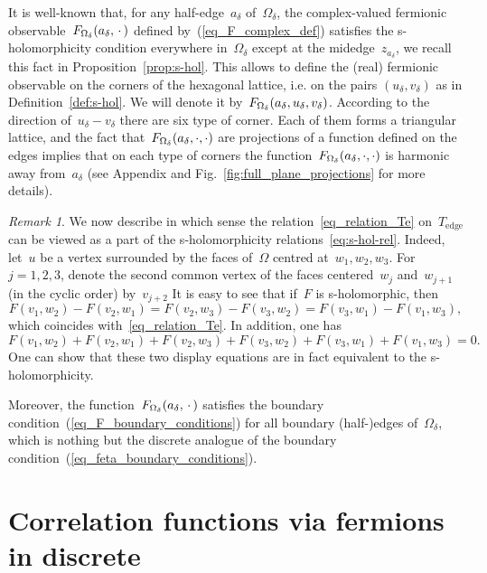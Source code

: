 \documentclass[reqno,11pt,a4paper]{amsart}
\theoremstyle{remark}
\newtheorem{remark}[proposition]{Remark}
\newcommand{\Te}{T_{\mathrm{edge}}}       \newcommand{\Ce}{c_{\mathrm{edge}}}
\begin{document}
It is well-known that, for any half-edge~$a_\delta$ of~$\Omega_\delta$, the complex-valued fermionic observable~$F_{\Omega_\delta}(a_\delta,\,\cdot\,)$ defined by~(\ref{eq_F_complex_def}) satisfies the s-holomorphicity condition everywhere in~$\Omega_\delta$ except at the midedge~$z_{a_\delta}$, we recall this fact in Proposition~\ref{prop:s-hol}. This allows to define the (real) fermionic observable on the corners of the hexagonal lattice, i.e. on the pairs $(u_\delta,v_\delta)$ as in Definition~\ref{def:s-hol}. We will denote it by~$F_{\Omega_\delta} (a_\delta,u_\delta,v_\delta)$.
According to the direction of~$u_\delta - v_\delta$ there are six type of corner. Each of them forms a triangular lattice, and the fact that~$F_{\Omega_\delta} (a_\delta,\cdot,\cdot)$ are projections of a function defined on the edges implies that on each type of corners the function~$F_{\Omega_\delta} (a_\delta,\cdot,\cdot)$ is harmonic away from~$a_\delta$ (see Appendix and Fig.~\ref{fig:full_plane_projections} for more details).

\begin{remark}
\label{rem:propag-eq-and-mercedes}
	We now describe in which sense the relation~\eqref{eq_relation_Te} on~$\Te$ can be viewed as a part of the s-holomorphicity relations~\eqref{eq:s-hol-rel}.
	Indeed, let~$u$ be a vertex surrounded by the faces of~$\Omega$ centred at~$w_1,w_2,w_3$.
	For~$j=1,2,3$, denote the second common vertex of the faces centered~$w_j$ and~$w_{j+1}$ (in the cyclic order) by~$v_{j+2}$
	It is easy to see that if~$F$ is s-holomorphic, then
	\[
		F(v_1,w_2) - F(v_2,w_1) = F(v_2,w_3) - F(v_3,w_2) = F(v_3,w_1) - F(v_1,w_3),
	\]
	which coincides with~\eqref{eq_relation_Te}.
	In addition, one has
	\[
		F(v_1,w_2) + F(v_2,w_1) + F(v_2,w_3) + F(v_3,w_2) + F(v_3,w_1) + F(v_1,w_3) = 0.
	\]
	One can show that these two display equations are in fact equivalent to the s-holomorphicity.
\end{remark}

Moreover, the function~$F_{\Omega_\delta}(a_\delta,\,\cdot\,)$ satisfies the boundary condition~(\ref{eq_F_boundary_conditions}) for all boundary (half-)edges of~$\Omega_\delta$, which is nothing but the discrete analogue of the boundary condition~(\ref{eq_feta_boundary_conditions}).


\setcounter{equation}{0}
\section{Correlation functions via fermions in discrete}
\label{sec:via-fermions-disc}
\end{document}
